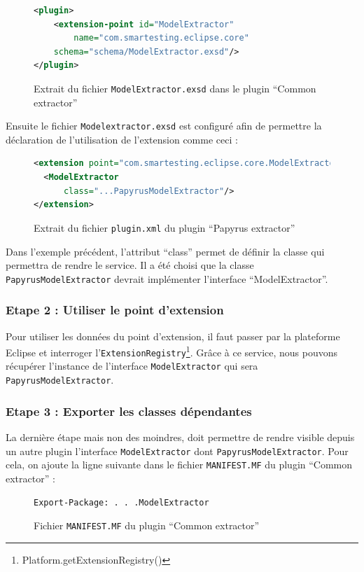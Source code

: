 \setlength\abovecaptionskip{0.25ex}
\setlength\belowcaptionskip{0.25ex}

\begin{figure}[H]
\centering
\begin{lstlisting}[language=XML]
<plugin>
	<extension-point id="ModelExtractor" 
		name="com.smartesting.eclipse.core"
	schema="schema/ModelExtractor.exsd"/>
</plugin>
\end{lstlisting}
\caption{Extrait du fichier \texttt{ModelExtractor.exsd} dans le plugin ``Common extractor''}
\end{figure}

Ensuite le fichier \texttt{Modelextractor.exsd} est configuré afin de permettre la déclaration de l'utilisation de l'extension comme ceci :
\begin{figure}[H]
\centering
\begin{lstlisting}[language=XML]
<extension point="com.smartesting.eclipse.core.ModelExtractor">
  <ModelExtractor
	  class="...PapyrusModelExtractor"/>
</extension>
\end{lstlisting}
\caption{Extrait du fichier \texttt{plugin.xml} du plugin ``Papyrus extractor''}
\end{figure}
Dans l'exemple précédent, l'attribut ``class'' permet de définir la classe qui permettra de rendre le service. 
Il a été choisi que la classe \texttt{PapyrusModelExtractor} devrait implémenter l'interface ``ModelExtractor''. 

\subsubsection{Etape 2 : Utiliser le point d'extension}

Pour utiliser les données du point d'extension, il faut passer par la plateforme Eclipse et interroger l'\texttt{ExtensionRegistry}\footnote{Platform.getExtensionRegistry()}. Grâce à ce service, nous pouvons récupérer l'instance de l'interface \texttt{ModelExtractor} qui sera \texttt{PapyrusModelExtractor}.

\subsubsection{Etape 3 : Exporter les classes dépendantes}

La dernière étape mais non des moindres, doit permettre de rendre visible depuis un autre plugin l'interface \texttt{ModelExtractor} dont \texttt{PapyrusModelExtractor}.
Pour cela, on ajoute la ligne suivante dans le fichier \texttt{MANIFEST.MF} du plugin ``Common extractor'' :
\begin{figure}[H]
\centering
\begin{verbatim}Export-Package: . . .ModelExtractor\end{verbatim}
\caption{Fichier \texttt{MANIFEST.MF} du plugin ``Common extractor''}
\end{figure}

